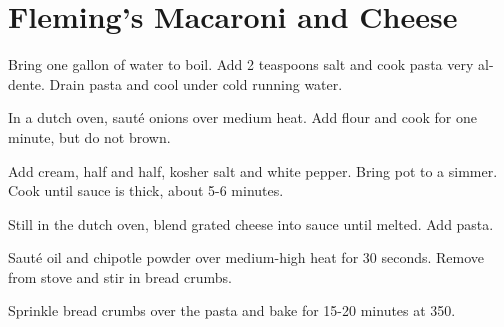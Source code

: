 
\section{Fleming's Macaroni and Cheese}
\begin{recipe}



Bring one gallon of water to boil. Add 2 teaspoons salt and cook pasta very al-dente. Drain pasta and cool under cold running water.


In a dutch oven, sauté onions over medium heat. Add flour and cook for one minute, but do not brown.


Add cream, half and half, kosher salt and white pepper. Bring pot to a simmer. Cook until sauce is thick, about 5-6 minutes.


Still in the dutch oven, blend grated cheese into sauce until melted. Add pasta.


Sauté oil and chipotle powder over medium-high heat for 30 seconds. Remove from stove and stir in bread crumbs.

Sprinkle bread crumbs over the pasta and bake for 15-20 minutes at 350\degree{}.

\end{recipe}
